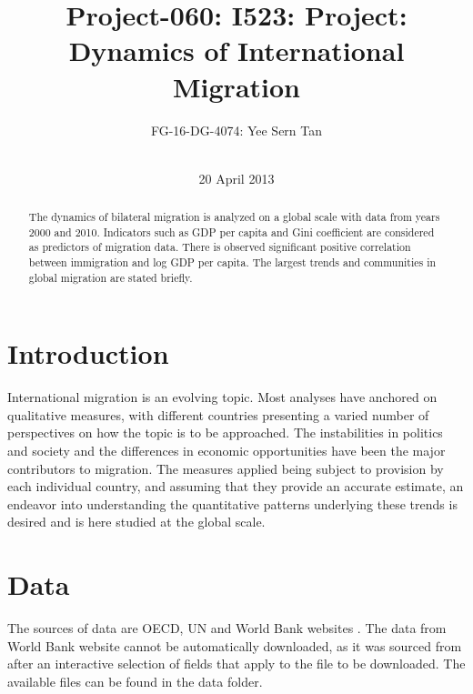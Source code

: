 \documentclass{acm_proc_article-sp}
\begin{document}
\title{Project-060: I523: Project:\\ Dynamics of International Migration}

\author{
\alignauthor
FG-16-DG-4074: Yee Sern Tan\\
       \\
       }

\date{20 April 2013}


\maketitle
\begin{abstract}
The dynamics of bilateral migration is analyzed on a global scale with data from years 2000 and 2010. Indicators such as GDP per capita and Gini coefficient are considered as predictors of migration data. There is observed significant positive correlation between immigration and log GDP per capita. The largest trends and communities in global migration are stated briefly.
\end{abstract}

\section{Introduction}
International migration is an evolving topic. Most analyses have anchored on qualitative measures, with different countries presenting a varied number of perspectives on how the topic is to be approached. The instabilities in politics and society and the differences in economic opportunities have been the major contributors to migration. The measures applied being subject to provision by each individual country, and assuming that they provide an accurate estimate, an endeavor into understanding the quantitative patterns underlying these trends is desired and is here studied at the global scale.

\section{Data}
The sources of data are OECD, UN and World Bank websites \cite{drc, oecd}. The data from World Bank website cannot be automatically downloaded, as it was sourced from \cite{worldbank_migr, worldbank_other} after an interactive selection of fields that apply to the file to be downloaded. The available files can be found in the data folder.
\end{document}
